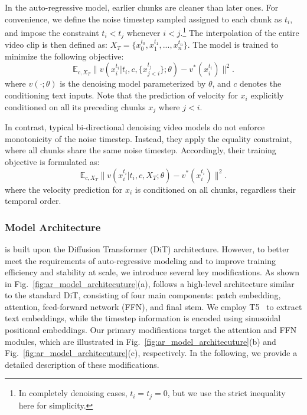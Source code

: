In the auto-regressive model, earlier chunks are cleaner than later ones. For convenience, we define the noise timestep sampled assigned to each chunk as $t_i$, and impose the constraint $t_i < t_j$ whenever $i < j$.\footnote{In completely denoising cases, $t_i=t_j=0$, but we use the strict inequality here for simplicity.} The interpolation of the entire video clip is then defined as: $X_T=\{x_0^{t_0}, x_1^{t_1}, ..., x_n^{t_n}\}$. The model is trained to minimize the following objective:
\begin{equation}
\mathbb{E}_{c, X_T}\parallel v(x_i^{t_i} | t_i, c, \{x_{j<i}^{t_j}\}; \theta) - v^*(x_i^{t_i})\parallel^2.
\end{equation}
where $v(\cdot; \theta)$ is the denoising model parameterized by $\theta$, and $c$ denotes the conditioning text inputs. Note that the prediction of velocity for $x_i$ explicitly conditioned on all its preceding chunks $x_j$ where $j<i$.

In contrast, typical bi-directional denoising video models do not enforce monotonicity of the noise timestep. Instead, they apply the equality constraint, where all chunks share the same noise timestep. Accordingly, their training objective is formulated as:
\begin{equation}
\mathbb{E}_{c, X_T}\parallel v(x_i^{t_i} | t_i, c, X_T; \theta) - v^*(x_i^{t_i})\parallel^2.
\end{equation}
where the velocity prediction for $x_i$ is conditioned on all chunks, regardless their temporal order.


\subsubsection{Model Architecture}
\magi is built upon the Diffusion Transformer (DiT) architecture. However, to better meet the requirements of auto-regressive modeling and to improve training efficiency and stability at scale, we introduce several key modifications. As shown in Fig.~\ref{fig:ar_model_architecuture}(a), \magi follows a high-level architecture similar to the standard DiT, consisting of four main components: patch embedding, attention, feed-forward network (FFN), and final stem. We employ T5~\citep{raffel2020exploring} to extract text embeddings, while the timestep information is encoded using sinusoidal positional embeddings.
Our primary modifications target the attention and FFN modules, which are illustrated in Fig.~\ref{fig:ar_model_architecuture}(b) and Fig.~\ref{fig:ar_model_architecuture}(c), respectively. In the following, we provide a detailed description of these modifications.

